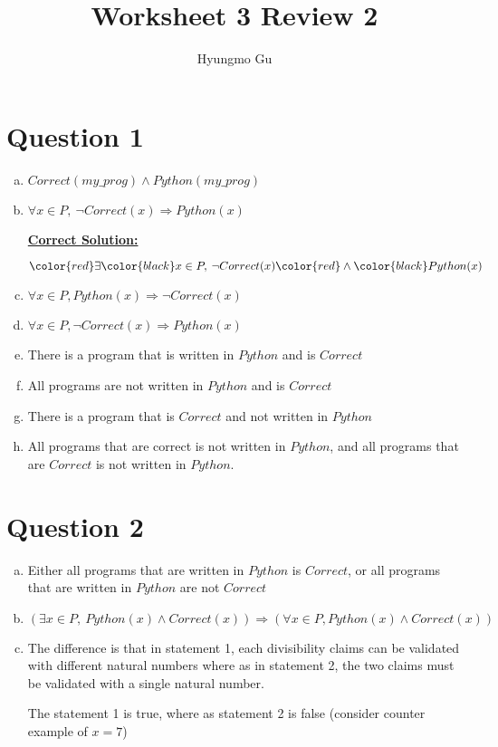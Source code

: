 \documentclass[12pt]{article}
\begin{document}
\title{Worksheet 3 Review 2}
\author{Hyungmo Gu}
\maketitle

\section*{Question 1}
\begin{enumerate}[a.]
    \item $Correct(my\_prog) \land Python(my\_prog)$
    \item

    $\forall x \in P,\: \neg Correct(x) \Rightarrow Python(x)$

    \begin{mdframed}
        \underline{\textbf{Correct Solution:}}

        $\color{red}\exists\color{black} x \in P,\: \neg Correct(x) \color{red}\land\color{black} Python(x)$
    \end{mdframed}

    \item $\forall x \in P, Python(x) \Rightarrow \neg Correct(x)$
    \item $\forall x \in P, \neg Correct(x) \Rightarrow Python(x)$
    \item There is a program that is written in $Python$ and is $Correct$
    \item All programs are not written in $Python$ and is $Correct$
    \item There is a program that is $Correct$ and not written in $Python$
    \item All programs that are correct is not written in $Python$, and all
    programs that are $Correct$ is not written in $Python$.
\end{enumerate}

\section*{Question 2}
\begin{enumerate}[a.]
    \item Either all programs that are written in $Python$ is $Correct$, or
    all programs that are written in $Python$ are not $Correct$
    \item $(\exists x \in P,\:Python(x) \land Correct(x)) \Rightarrow
    (\forall x \in P, Python(x) \land Correct(x))$
    \item The difference is that in statement 1, each divisibility claims can be
    validated with different natural numbers where as in statement 2,
    the two claims must be validated with a single natural number.

    \bigskip

    The statement 1 is true, where as statement 2 is false (consider counter example
    of $x = 7$)
\end{enumerate}
\end{document}
